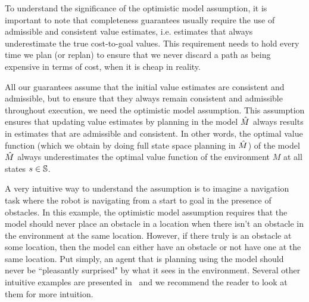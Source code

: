 To understand the significance of the optimistic model assumption, it
is important to note that completeness guarantees usually require the
use of admissible and consistent value estimates, i.e. estimates that
always underestimate the true cost-to-goal values. This requirement
needs to hold every time we plan (or replan) to ensure that we never
discard a path as being expensive in terms of cost, when it is cheap
in reality.


All our guarantees assume that the initial value estimates are
consistent and admissible, but to ensure that they always remain
consistent and admissible throughout execution, we need the optimistic
model assumption. This assumption ensures that updating value
estimates by planning in the model $\hat{M}$ always results in estimates
that are admissible and consistent. In other words, the optimal value
function (which we obtain by doing full state space planning in
$\hat{M}$) of the model $\hat{M}$ always underestimates the optimal value
function of the environment $M$ at all states $s \in \mathbb{S}$.


A very intuitive way to understand the assumption is to imagine a
navigation task where the robot is navigating from a start to goal in
the presence of obstacles. In this example, the optimistic model
assumption requires that the model should never place an obstacle in a
location when there isn't an obstacle in the environment at the same
location. However, if there truly is an obstacle at some location,
then the model can either have an obstacle or not have one at the same
location. Put simply, an agent that is planning using the model should
never be ``pleasantly surprised" by what it sees in the
environment. Several other intuitive examples are presented
in~\cite{DBLP:conf/aaai/Jiang18} and we recommend the reader to look
at them for more intuition.


